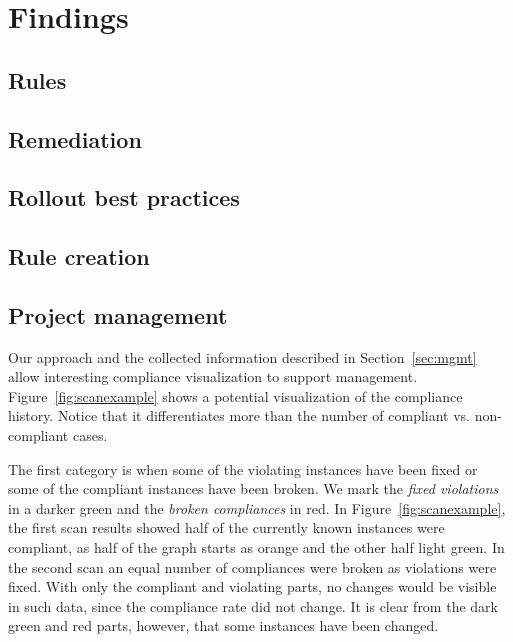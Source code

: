 \section{Findings}

\subsection{Rules}



\subsection{Remediation}

\subsection{Rollout best practices}
\label{sec:rollout}




\subsection{Rule creation}




\subsection{Project management}
Our approach and the collected information described in  Section~\ref{sec:mgmt}  allow  interesting  compliance  visualization to  support  management. Figure~\ref{fig:scanexample} shows a potential visualization of the compliance history. Notice that it differentiates more than the number of compliant vs. non-compliant cases.

The first category is when some of the violating instances have been fixed or some of the compliant instances have been broken. We mark the \emph{fixed violations} in a darker green and the \emph{broken compliances} in red. In Figure~\ref{fig:scanexample}, the first scan results showed half of the currently known instances were compliant, as half of the graph starts as orange and the other half light green. In the second scan an equal number of compliances were broken as violations were fixed. With only the compliant and violating parts, no changes would be visible in such data, since the compliance rate did not change. It is clear from the dark green and red parts, however, that some instances have been changed.

